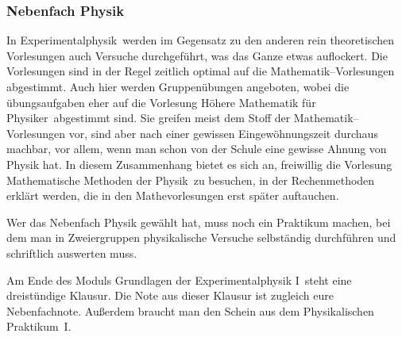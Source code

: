 \subsubsection{Nebenfach Physik}

In \glqq Experimentalphysik\grqq\ werden im Gegensatz
zu den anderen rein theoretischen Vorlesungen
auch Versuche durchgeführt, was das Ganze etwas auflockert.
Die Vorlesungen sind in der Regel
zeitlich optimal auf die Mathematik--Vorlesungen abgestimmt.
Auch hier werden Gruppenübungen angeboten,
wobei die übungsaufgaben eher auf die Vorlesung
\glqq Höhere Mathematik für Physiker\grqq\ abgestimmt sind.
Sie greifen meist dem Stoff der Mathematik--Vorlesungen vor, 
sind aber nach einer gewissen Eingewöhnungszeit durchaus machbar,
vor allem, wenn man schon von der Schule
eine gewisse Ahnung von Physik hat.
In diesem Zusammenhang bietet es sich an,
freiwillig die Vorlesung
\glqq Mathematische Methoden der Physik\grqq\ zu besuchen,
in der Rechenmethoden erklärt werden,
die in den Mathevorlesungen erst später auftauchen. 

Wer das Nebenfach Physik gewählt hat,
muss noch ein Praktikum machen,
bei dem man in Zweiergruppen physikalische Versuche
selbständig durchführen und schriftlich auswerten muss.


\begin{center}
\end{center}
Am Ende des Moduls \glqq Grundlagen der Experimentalphysik I\grqq\ 
steht eine dreistündige Klausur.
Die Note aus dieser Klausur ist zugleich eure Nebenfachnote.
Außerdem braucht man den Schein aus dem \glqq Physikalischen Praktikum~I\grqq.

